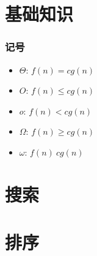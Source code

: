 \section{基础知识}
\subsubsection*{记号}
\begin{itemize}
    \item $\Theta$: $f(n) = cg(n)$
    \item $O$: $f(n) \le cg(n)$
    \item $o$: $f(n) < cg(n)$
    \item $\Omega$: $f(n) \ge cg(n)$
    \item $\omega$: $f(n) \> cg(n)$
\end{itemize}

\section{搜索}
\section{排序}